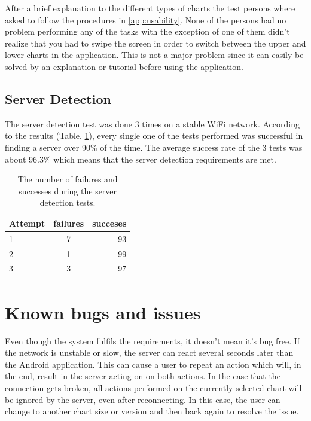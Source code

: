 \documentclass[12pt,a4paper,notitlepage]{report}
\begin{document}
After a brief explanation to the different types of charts the test persons where asked to follow the procedures in \ref{app:usability}. None of the persons had no problem performing any of the tasks with the exception of one of them didn't realize that you had to swipe the screen in order to switch between the upper and lower charts in the application. This is not a major problem since it can easily be solved by an explanation or tutorial before using the application.



\subsection{Server Detection}
The server detection test was done 3 times on a stable WiFi network. According to the results (Table. \ref{tab:server_detection_test}), every single one of the tests performed was successful in finding a server over 90\% of the time. The average success rate of the 3 tests was about 96.3\% which means that the server detection requirements are met.

\begin{table}[ht!]
\centering
\begin{tabular}{l c r}
Attempt	&	failures	&	succeses	\\
\hline
1	&	7	&	93	\\
2	&	1	&	99	\\
3	&	3	&	97	\\
\end{tabular}
\caption{The number of failures and successes during the server detection tests. \label{tab:server_detection_test}}
\end{table}


\section{Known bugs and issues}
Even though the system fulfils the requirements, it doesn't mean it's bug free. If the network is unstable or slow, the server can react several seconds later than the Android application. This can cause a user to repeat an action which will, in the end, result in the server acting on on both actions. In the case that the connection gets broken, all actions performed on the currently selected chart will be ignored by the server, even after reconnecting. In this case, the user can change to another chart size or version and then back again to resolve the issue.
\end{document}
